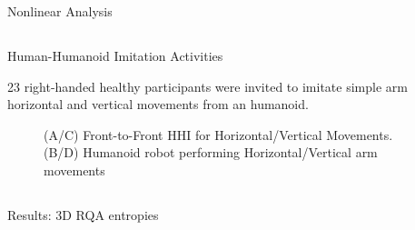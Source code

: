 {{\begin{frame}{Nonlinear Analysis}
\end{frame}
}




\subsection{}
{

\begin{frame}{Human-Humanoid Imitation Activities}

\small
23 right-handed healthy participants were invited to imitate 
simple arm horizontal and vertical movements from an humanoid.
    \begin{figure}
	\caption[PA]{(A/C) Front-to-Front HHI  
		for Horizontal/Vertical Movements.
		(B/D) Humanoid robot performing Horizontal/Vertical arm movements
		}
   \end{figure}
	
\end{frame}
}




\subsection{}
{

\begin{frame}{Results: 3D RQA entropies}
    \begin{figure}
   \end{figure}
	
\end{frame}
}



\subsection{}
{

}}

